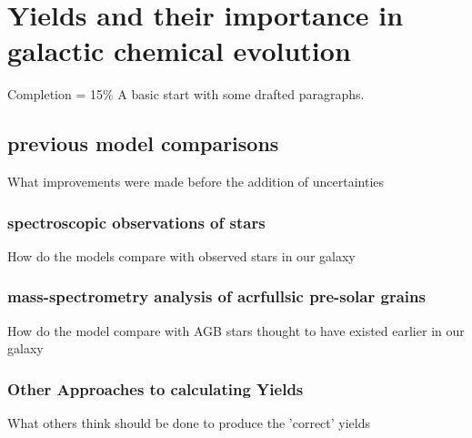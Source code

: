 \chapter{Yields and their importance in galactic chemical evolution}

Completion = 15\%
A basic start with some drafted paragraphs.

\section{previous model comparisons}

What improvements were made before the addition of uncertainties

\subsection{spectroscopic observations of stars}

How do the models compare with observed stars in our galaxy

\subsection{mass-spectrometry analysis of acrfull{sic} pre-solar grains}

How do the model compare with AGB stars thought to have existed earlier in our galaxy

\subsection{Other Approaches to calculating Yields}

What others think should be done to produce the 'correct' yields
